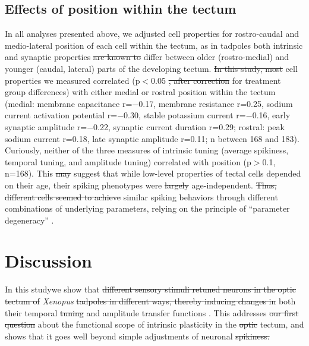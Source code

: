 \documentclass{article}
\providecommand{\DIFaddtex}[1]{{\protect\color{blue}{#1}}} %
\providecommand{\DIFdeltex}[1]{{\protect\color{red}\sout{#1}}}                      %
\providecommand{\DIFaddbegin}{} %
\providecommand{\DIFaddend}{} %
\providecommand{\DIFdelbegin}{} %
\providecommand{\DIFdelend}{} %
\providecommand{\DIFadd}[1]{\texorpdfstring{\DIFaddtex{#1}}{#1}} %
\providecommand{\DIFdel}[1]{\texorpdfstring{\DIFdeltex{#1}}{}} %
\newcommand{\DIFscaledelfig}{0.5}
\newlength{\DIFdelgraphicswidth} %
\newlength{\DIFdelgraphicsheight} %
\newcommand{\DIFaddincludegraphics}[2][]{{\color{blue}\fbox{\DIFOincludegraphics[#1]{#2}}}} %
\newcommand{\DIFdelincludegraphics}[2][]{%
\sbox{\DIFdelgraphicsbox}{\DIFOincludegraphics[#1]{#2}}%
\settoboxwidth{\DIFdelgraphicswidth}{\DIFdelgraphicsbox} %
\settoboxtotalheight{\DIFdelgraphicsheight}{\DIFdelgraphicsbox} %
\scalebox{\DIFscaledelfig}{%
\parbox[b]{\DIFdelgraphicswidth}{\usebox{\DIFdelgraphicsbox}\\[-\baselineskip] \rule{\DIFdelgraphicswidth}{0em}}\llap{\resizebox{\DIFdelgraphicswidth}{\DIFdelgraphicsheight}{%
\setlength{\unitlength}{\DIFdelgraphicswidth}%
\begin{picture}(1,1)%
\thicklines\linethickness{2pt} %
{\color[rgb]{1,0,0}\put(0,0){\framebox(1,1){}}}%
{\color[rgb]{1,0,0}\put(0,0){\line( 1,1){1}}}%
{\color[rgb]{1,0,0}\put(0,1){\line(1,-1){1}}}%
\end{picture}%
}\hspace*{3pt}}} %
} %
\DeclareRobustCommand{\DIFaddbegin}{\DIFOaddbegin \let\includegraphics\DIFaddincludegraphics} %
\DeclareRobustCommand{\DIFaddend}{\DIFOaddend \let\includegraphics\DIFOincludegraphics} %
\DeclareRobustCommand{\DIFdelbegin}{\DIFOdelbegin \let\includegraphics\DIFdelincludegraphics} %
\DeclareRobustCommand{\DIFdelend}{\DIFOaddend \let\includegraphics\DIFOincludegraphics} %
\begin{document}
\subsection*{Effects of position within the tectum}

In all analyses presented above, we adjusted cell properties for rostro-caudal and medio-lateral position of each cell within the tectum, as in tadpoles both intrinsic \citep{hamodi2014} and synaptic properties \citep{wu1996,khakhalin2012} \DIFdelbegin \DIFdel{are known to }\DIFdelend differ between older (rostro-medial) and younger (caudal, lateral) parts of the developing tectum. \DIFdelbegin \DIFdel{In this study, most }\DIFdelend \DIFaddbegin \DIFadd{Most }\DIFaddend cell properties we measured \DIFaddbegin \DIFadd{in this study }\DIFaddend correlated (p$<$0.05 \DIFdelbegin \DIFdel{, after correction }\DIFdelend \DIFaddbegin \DIFadd{after adjustment }\DIFaddend for treatment group differences) with either medial or rostral position within the tectum (medial: membrane capacitance r=$-$0.17, membrane resistance r=0.25, sodium current activation potential r=$-$0.30, stable potassium current r=$-$0.16, early synaptic amplitude r=$-$0.22, synaptic current duration r=0.29; rostral: peak sodium current r=0.18, late synaptic amplitude r=0.11; n between 168 and 183). Curiously, neither of the three measures of intrinsic tuning (average spikiness, temporal tuning, and amplitude tuning) correlated with position (p$>$0.1, n=168). This \DIFdelbegin \DIFdel{may }\DIFdelend \DIFaddbegin \DIFadd{seems to }\DIFaddend suggest that while low-level properties of tectal cells depended on their \DIFaddbegin \DIFadd{developmental }\DIFaddend age, their spiking phenotypes were \DIFdelbegin \DIFdel{largely }\DIFdelend age-independent. \DIFdelbegin \DIFdel{Thus, different cells seemed to achieve }\DIFdelend \DIFaddbegin \DIFadd{This means that different cells achieved }\DIFaddend similar spiking behaviors through different combinations of underlying parameters, relying on the principle of “parameter degeneracy” \citep{prinz2004degeneracy,drion2015}.


\section*{Discussion}

In this study\DIFaddbegin \DIFadd{, }\DIFaddend we show that \DIFdelbegin \DIFdel{different sensory stimuli retuned neurons in the optic tectum of }\DIFdelend \DIFaddbegin \DIFadd{stimuli of different temporal dynamics differentially retune }\DIFaddend \textit{Xenopus} \DIFdelbegin \DIFdel{tadpoles in different ways, thereby inducing changes in }\DIFdelend \DIFaddbegin \DIFadd{tectal neurons, changing }\DIFaddend both their temporal \DIFdelbegin \DIFdel{tuning }\DIFdelend and amplitude transfer functions \DIFaddbegin \DIFadd{(Figure 2)}\DIFaddend . This addresses \DIFdelbegin \DIFdel{our first question }\DIFdelend \DIFaddbegin \DIFadd{the first question of this study, }\DIFaddend about the functional scope of intrinsic plasticity in the \DIFdelbegin \DIFdel{optic }\DIFdelend tectum, and shows that it goes well beyond simple adjustments of neuronal \DIFdelbegin \DIFdel{spikiness.
}\DIFdelend \DIFaddbegin \DIFadd{excitability.
}\DIFaddend 
\end{document}
